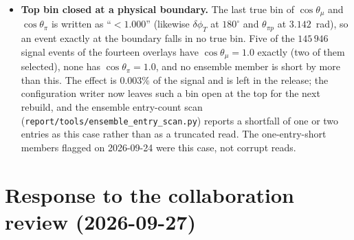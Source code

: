 \begin{itemize}
    inputs used POT weights and $A_C$-smeared integrals; with fluence weights on the one-bin truths
    the ratio is $1.000$ (inclusive) and $1.001$ (proton-tagged).
  \item \textbf{Top bin closed at a physical boundary.} The last true bin of $\cos\theta_\mu$ and
    $\cos\theta_\pi$ is written as ``$<1.000$'' (likewise $\delta\phi_T$ at $180^\circ$ and
    $\theta_{\pi p}$ at $3.142$~rad), so an event exactly at the boundary falls in no true bin. Five of
    the $145\,946$ signal events of the fourteen overlays have $\cos\theta_\mu=1.0$ exactly (two of
    them selected), none has $\cos\theta_\pi=1.0$, and no ensemble member is short by more than this.
    The effect is $0.003\%$ of the signal and is left in the release; the configuration writer now
    leaves such a bin open at the top for the next rebuild, and the ensemble entry-count scan
    (\texttt{report/tools/ensemble\_entry\_scan.py}) reports a shortfall of one or two entries as this
    case rather than as a truncated read. The one-entry-short members flagged on 2026-09-24 were this
    case, not corrupt reads.
\end{itemize}

\section{Response to the collaboration review (2026-09-27)}

